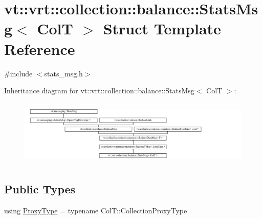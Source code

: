\hypertarget{structvt_1_1vrt_1_1collection_1_1balance_1_1_stats_msg}{}\section{vt\+:\+:vrt\+:\+:collection\+:\+:balance\+:\+:Stats\+Msg$<$ ColT $>$ Struct Template Reference}
\label{structvt_1_1vrt_1_1collection_1_1balance_1_1_stats_msg}


{\ttfamily \#include $<$stats\+\_\+msg.\+h$>$}

Inheritance diagram for vt\+:\+:vrt\+:\+:collection\+:\+:balance\+:\+:Stats\+Msg$<$ ColT $>$\+:\begin{figure}[H]
\begin{center}
\leavevmode
\includegraphics[height=3.163842cm]{structvt_1_1vrt_1_1collection_1_1balance_1_1_stats_msg}
\end{center}
\end{figure}
\subsection*{Public Types}
\begin{DoxyCompactItemize}
\item 
using \hyperlink{structvt_1_1vrt_1_1collection_1_1balance_1_1_stats_msg_a6f88a58947e0a02b3f7dcfec8b91b5fd}{Proxy\+Type} = typename Col\+T\+::\+Collection\+Proxy\+Type
\end{DoxyCompactItemize}
